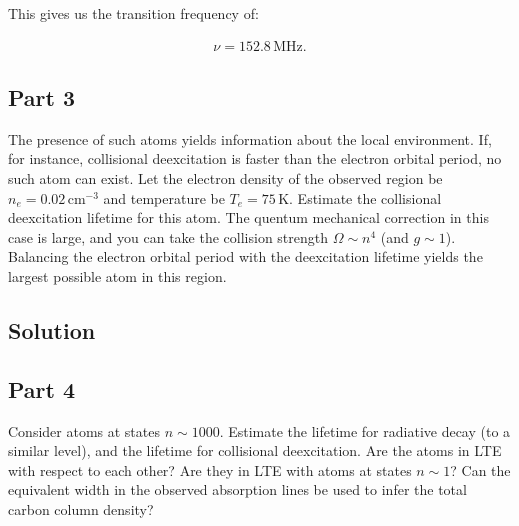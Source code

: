 \documentclass[12pt]{article}
\begin{document}
This gives us the transition frequency of:

\begin{align*}
\boxed{ \nu = 152.8\,\mathrm{MHz}}.
\end{align*}

\subsection*{Part 3}

The presence of such atoms yields information about the local environment. If, for instance, collisional deexcitation is faster than the electron orbital period, no such atom can exist. Let the electron density of the observed region be $n_e=0.02\,\mathrm{cm^{-3}}$ and temperature be $T_e=75\,\mathrm{K}$. Estimate the collisional deexcitation lifetime for this atom. The quentum mechanical correction in this case is large, and you can take the collision strength $\Omega \sim n^4$ (and $g\sim1$). Balancing the electron orbital period with the deexcitation lifetime yields the largest possible atom in this region.


\subsection*{Solution}




\subsection*{Part 4}

Consider atoms at states $n\sim1000$. Estimate the lifetime for radiative decay (to a similar level), and the lifetime for collisional deexcitation. Are the atoms in LTE with respect to each other? Are they in LTE with atoms at states $n\sim1$? Can the equivalent width in the observed absorption lines be used to infer the total carbon column density?

\end{document}
